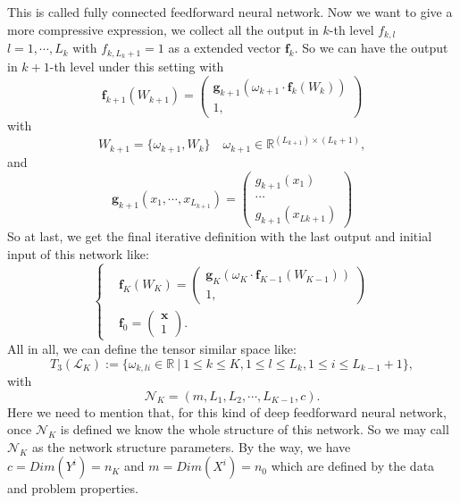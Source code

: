 This is called fully connected feedforward neural network. Now we want to give a more compressive expression, we collect all the output in $k$-th level $f_{k,l}$ $l = 1,\cdots, L_k$ with $f_{k,L_k+1} = 1$ as a extended vector $\bm{f}_k$. 
So we can have the output in $k+1$-th level under this setting with 
\begin{equation}
    \bm{f}_{k+1}(W_{k+1}) = 
    \begin{pmatrix}
        \bm{g}_{k+1}(\omega_{k+1} \cdot \bm{f}_k(W_k)) \\
        1,
    \end{pmatrix}
\end{equation}
with 
\begin{equation}
    W_{k+1} = \{ \omega_{k+1}, W_k\} \quad \omega_{k+1} \in \mathbb{R}^{(L_{k+1}) \times (L_{k} + 1)},
\end{equation}
and
\begin{equation}
    \bm{g}_{k+1}(x_1,\cdots,x_{L_{k+1}}) = 
    \begin{pmatrix}
        g_{k+1}(x_1) \\ 
        \cdots  \\
        g_{k+1}(x_{L{k+1}})
    \end{pmatrix}
\end{equation}
So at last, we get the final iterative definition with the last output and initial input of this network like:
\begin{equation}
    \begin{cases}
        &\bm{f}_K(W_{K}) = 
        \begin{pmatrix}
            \bm{g}_{K}(\omega_{K} \cdot \bm{f}_{K-1}(W_{K-1})) \\
            1,
        \end{pmatrix} \\
        &\bm{f}_0 = 
        \begin{pmatrix}
            \bm{x} \\
            1
        \end{pmatrix}.
    \end{cases}
\end{equation}
All in all, we can define the tensor similar space like:
\begin{equation}
    T_{3}(\mathcal{L}_K) := \{ \omega_{k,li} \in \mathbb{R}~|~ 1 \le k \le K, 1\le l \le L_k, 1 \le i \le L_{k-1} + 1\}, 
\end{equation}
with 
\begin{equation}
    \mathcal{N}_{K} = (m, L_1, L_2, \cdots, L_{K-1}, c).
\end{equation}
Here we need to mention that, for this kind of deep feedforward neural network, once $\mathcal{N}_K$ is defined we know the whole structure of this network. So we may call $\mathcal{N}_K$ as the network structure parameters. By the way, we have $c = Dim(Y^i) = n_K$ and $m = Dim(X^i) = n_0 $ which are defined by the data and problem properties.

